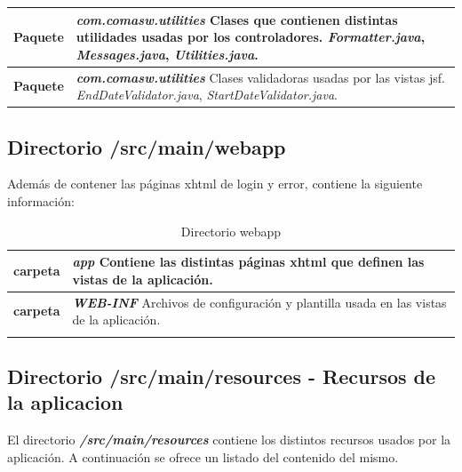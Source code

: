 \begin{longtable}{m{3cm} m{12cm}}
	\textbf{Paquete} & \textit{\textbf{com.comasw.utilities}} \newline
     Clases que contienen distintas utilidades usadas por los controladores.\newline
\textit{Formatter.java},
\textit{Messages.java},
\textit{Utilities.java}.
	\\\hline


	\textbf{Paquete} & \textit{\textbf{com.comasw.utilities}} \newline
     Clases validadoras usadas por las vistas \acrshort{jsf}.\newline
\textit{EndDateValidator.java},
\textit{StartDateValidator.java}.
	\\\hline


\end{longtable}

 


\subsection{Directorio /src/main/webapp}
\label{sub:web}
Además de contener las páginas \acrshort{xhtml} de login y error, contiene la siguiente información:


\begin{longtable}{m{3cm} m{12cm}}
    \caption{Directorio webapp}
    \label{tab:web}\\  	
    \rowcolors{2}{white}{white}
    \textbf{carpeta} & \textit{\textbf{app}} \newline
    Contiene las distintas páginas \acrshort{xhtml} que definen las vistas de la aplicación.
    \\\hline
    \textbf{carpeta} & \textit{\textbf{WEB-INF}} \newline
    Archivos de configuración y plantilla usada en las vistas de la aplicación.
	\\\hline
\\\hline

\end{longtable}    
 


\subsection{Directorio /src/main/resources - Recursos de la aplicacion}
\label{sub:recursos-aplicacion}
El directorio \textit{\textbf{/src/main/resources}} contiene los distintos recursos usados por la aplicación. A continuación se ofrece un listado del contenido del mismo.


